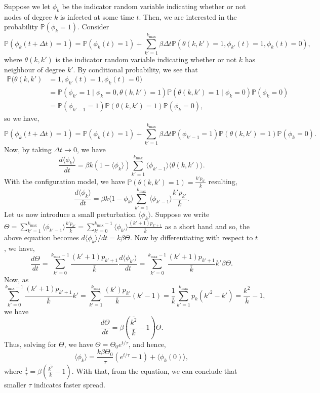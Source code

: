 \documentclass[
]{article}
\theoremstyle{definition}
\begin{document}
Suppose we let \(\phi_k\) be the indicator random variable indicating
whether or not nodes of degree \(k\) is infected at some time \(t\).
Then, we are interested in the probability \(\mathbb{P}(\phi_k = 1)\).
Consider
\[\mathbb{P}(\phi_k(t + \Delta t) = 1) = \mathbb{P}(\phi_k(t) = 1) + 
  \sum_{k' = 1}^{k_{\max}} \beta \Delta t 
  \mathbb{P}(\theta(k, k') = 1, \phi_{k'}(t) = 1, \phi_k(t) = 0),\]
where \(\theta(k, k')\) is the indicator random variable indicating
whether or not \(k\) has neighbour of degree \(k'\). By conditional
probability, we see that \begin{align*}
  \mathbb{P}(\theta(k, k') & = 1, \phi_{k'}(t) = 1, \phi_k(t) = 0) \\
  & = \mathbb{P}(\phi_{k'} = 1 \mid \phi_k = 0, \theta(k, k') = 1)
    \mathbb{P}(\theta(k, k') = 1 \mid \phi_k = 0) \mathbb{P}(\phi_k = 0) \\
  & = \mathbb{P}(\phi_{k' - 1} = 1) \mathbb{P}(\theta(k, k') = 1) 
    \mathbb{P}(\phi_k = 0),
\end{align*} so we have,
\[\mathbb{P}(\phi_k(t + \Delta t) = 1) = \mathbb{P}(\phi_k(t) = 1) + 
  \sum_{k' = 1}^{k_{\max}} \beta \Delta t 
  \mathbb{P}(\phi_{k' - 1} = 1) \mathbb{P}(\theta(k, k') = 1) \mathbb{P}(\phi_k = 0).\]
Now, by taking \(\Delta t \to 0\), we have
\[\frac{d \langle \phi_k \rangle}{dt} = \beta k (1 - \langle \phi_k \rangle) 
  \sum_{k' = 1}^{k_{\max}} \langle \phi_{k' - 1} \rangle \langle \theta(k, k') \rangle.\]
With the configuration model, we have
\(\mathbb{P}(\theta(k, k') = 1) = \frac{k' p_{k'}}{\bar{k}}\) resulting,
\[\frac{d \langle \phi_k \rangle}{dt} = \beta k \langle 1 - \phi_k \rangle
  \sum_{k' = 1}^{k_{\max}} \langle \phi_{k' - 1} \rangle \frac{k' p_{k'}}{\bar{k}}.\]
Let us now introduce a small perturbation \(\langle \phi_k \rangle\).
Suppose we write
\(\Theta = \sum_{k' = 1}^{k_{\max}} \langle \phi_{k' - 1} \rangle \frac{k' p_{k'}}{\bar{k}} = \sum_{k' = 0}^{k_{\max} - 1} \langle \phi_{k'} \rangle \frac{(k' + 1) p_{k' + 1}}{\bar{k}}\)
as a short hand and so, the above equation becomes
\(d\langle \phi_k \rangle / dt = k\beta \Theta\). Now by differentiating
with respect to \(t\), we have,
\[\frac{d\Theta}{dt} = \sum_{k' = 0}^{k_{\max} - 1} \frac{(k' + 1) p_{k' + 1}}{\bar{k}}
\frac{d\langle \phi_{k'} \rangle }{dt} = \sum_{k' = 0}^{k_{\max} - 1} 
\frac{(k' + 1) p_{k' + 1}}{\bar{k}}k'\beta \Theta.\] Now, as
\[\sum_{k' = 0}^{k_{\max} - 1} \frac{(k' + 1) p_{k' + 1}}{\bar{k}}k' = 
  \sum_{k' = 1}^{k_{\max}} \frac{(k') p_{k'}}{\bar{k}}(k' - 1) = \frac{1}{\bar{k}} 
  \sum_{k' = 1}^{k_{\max}}p_k(k'^2- k') = \frac{\bar{k^2}}{\bar{k}} - 1,\]
we have
\[\frac{d\Theta}{dt} = \beta \left(\frac{\bar{k^2}}{\bar{k}} - 1\right) \Theta.\]
Thus, solving for \(\Theta\), we have
\(\Theta = \Theta_0 e^{t / \tau}\), and hence,
\[\langle \phi_k \rangle = \frac{k\beta\Theta_0}{\tau}(e^{t / \tau} - 1) + 
  \langle \phi_k(0) \rangle,\] where
\(\frac{1}{\tau} = \beta(\frac{\bar{k^2}}{\bar{k}} - 1)\). With that,
from the equation, we can conclude that smaller \(\tau\) indicates
faster spread.
\end{document}
